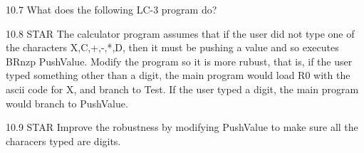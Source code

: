 \documentclass{patt}
\begin{document}
\begin{exercises}
\item [10.7]
  What does the following LC-3 program do?

\item[10.8]STAR The calculator program assumes that if the user did not type one of the characters X,C,+,-,*,D, then it must be pushing a value and so executes BRnzp PushValue.  Modify the program so it is more rubust, that is, if the user typed something other than a digit, the main program would load R0 with the ascii code for X, and branch to Test. If the user typed a digit, the main program would branch to PushValue.

\item[10.9]STAR Improve the robustness by modifying PushValue to make sure
all the characers typed are digits.

\end{exercises}
\end{document}
